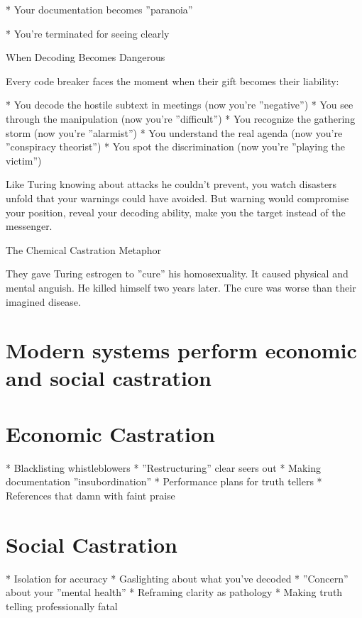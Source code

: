 \documentclass[12pt,oneside]{book}
\begin{document}
                    * Your documentation becomes ''paranoia''

                    * You're terminated for seeing clearly

When Decoding Becomes Dangerous

Every code breaker faces the moment when their gift becomes their liability:

                    * You decode the hostile subtext in meetings (now you're ''negative'')
                    * You see through the manipulation (now you're ''difficult'')
                    * You recognize the gathering storm (now you're ''alarmist'')
                    * You understand the real agenda (now you're ''conspiracy theorist'')
                    * You spot the discrimination (now you're ''playing the victim'')

Like Turing knowing about attacks he couldn't prevent, you watch disasters unfold that your warnings could have avoided. But warning would compromise your position, reveal your decoding ability, make you the target instead of the messenger.

The Chemical Castration Metaphor

They gave Turing estrogen to ''cure'' his homosexuality. It caused physical and mental anguish. He killed himself two years later. The cure was worse than their imagined disease.

\section{Modern systems perform economic and social castration}

\section{Economic Castration}

                    * Blacklisting whistleblowers
                    * ''Restructuring'' clear seers out
                    * Making documentation ''insubordination''
                    * Performance plans for truth tellers
                    * References that damn with faint praise

\section{Social Castration}

                    * Isolation for accuracy
                    * Gaslighting about what you've decoded
                    * ''Concern'' about your ''mental health''
                    * Reframing clarity as pathology
                    * Making truth telling professionally fatal
\end{document}
